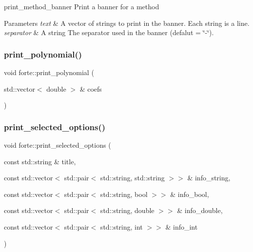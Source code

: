 print\+\_\+method\+\_\+banner Print a banner for a method 


\begin{DoxyParams}{Parameters}
{\em text} & A vector of strings to print in the banner. Each string is a line. \\
\hline
{\em separator} & A string The separator used in the banner (defalut = \char`\"{}-\/\char`\"{}). \\
\hline
\end{DoxyParams}
\mbox{\label{namespaceforte_aa3aad70028aaf787650cea71183fc340}} 
\subsubsection{\texorpdfstring{print\+\_\+polynomial()}{print\_polynomial()}}
{\footnotesize\ttfamily void forte\+::print\+\_\+polynomial (\begin{DoxyParamCaption}\item[{std\+::vector$<$ double $>$ \&}]{coefs }\end{DoxyParamCaption})}

\mbox{\label{namespaceforte_a5364cef3c69e94cc246f14caf39f2e61}} 
\subsubsection{\texorpdfstring{print\+\_\+selected\+\_\+options()}{print\_selected\_options()}}
{\footnotesize\ttfamily void forte\+::print\+\_\+selected\+\_\+options (\begin{DoxyParamCaption}\item[{const std\+::string \&}]{title,  }\item[{const std\+::vector$<$ std\+::pair$<$ std\+::string, std\+::string $>$$>$ \&}]{info\+\_\+string,  }\item[{const std\+::vector$<$ std\+::pair$<$ std\+::string, bool $>$$>$ \&}]{info\+\_\+bool,  }\item[{const std\+::vector$<$ std\+::pair$<$ std\+::string, double $>$$>$ \&}]{info\+\_\+double,  }\item[{const std\+::vector$<$ std\+::pair$<$ std\+::string, int $>$$>$ \&}]{info\+\_\+int }\end{DoxyParamCaption})}



